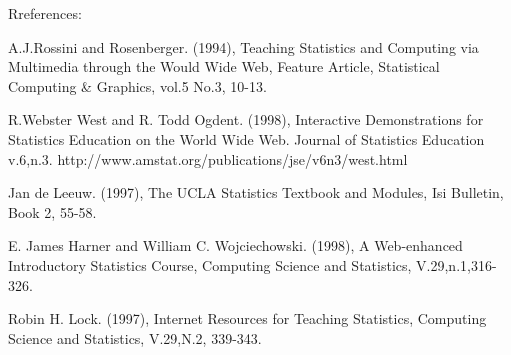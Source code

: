 Rreferences:

A.J.Rossini and Rosenberger. (1994), Teaching Statistics and Computing via 
Multimedia through the Would Wide Web, Feature Article, Statistical Computing 
& Graphics, vol.5 No.3, 10-13.

R.Webster West and R. Todd Ogdent. (1998), Interactive Demonstrations for 
Statistics Education on the World Wide Web. Journal of Statistics Education 
v.6,n.3. http://www.amstat.org/publications/jse/v6n3/west.html

Jan de Leeuw. (1997), The UCLA Statistics Textbook and Modules, Isi Bulletin, 
Book 2, 55-58.

E. James Harner and William C. Wojciechowski. (1998), A Web-enhanced 
Introductory Statistics Course, Computing Science and Statistics, 
V.29,n.1,316-326.

Robin H. Lock. (1997), Internet Resources for Teaching Statistics, Computing 
Science and Statistics, V.29,N.2, 339-343.

